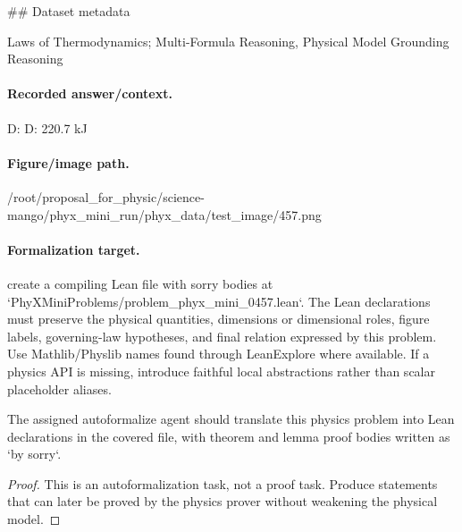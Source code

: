 \#\# Dataset metadata

Laws of Thermodynamics; Multi-Formula Reasoning, Physical Model Grounding Reasoning

\paragraph{Recorded answer/context.}
D: D: 220.7 kJ

\paragraph{Figure/image path.}
/root/proposal\_for\_physic/science-mango/phyx\_mini\_run/phyx\_data/test\_image/457.png

\paragraph{Formalization target.}
create a compiling Lean file with sorry bodies at `PhyXMiniProblems/problem\_phyx\_mini\_0457.lean`. The Lean declarations must preserve the physical quantities, dimensions or dimensional roles, figure labels, governing-law hypotheses, and final relation expressed by this problem.
Use Mathlib/Physlib names found through LeanExplore where available. If a physics API is missing, introduce faithful local abstractions rather than scalar placeholder aliases.

\begin{theorem}
\label{thm:physics:phyx_mini_0457:target}
The assigned autoformalize agent should translate this physics problem into Lean declarations in the covered file, with theorem and lemma proof bodies written as `by sorry`.
\end{theorem}
\begin{proof}
This is an autoformalization task, not a proof task. Produce statements that can later be proved by the physics prover without weakening the physical model.
\end{proof}

